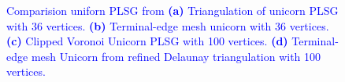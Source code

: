 \begin{figure}[!h]
\centering     %
{}%
%
%

\caption{\textcolor{blue}{Comparision uniforn PLSG from \cite{AlejandroNUA2019} \textbf{(a)} Triangulation of unicorn PLSG with 36 vertices. \textbf{(b)} Terminal-edge mesh unicorn with 36 vertices. \textbf{(c)} Clipped Voronoi Unicorn PLSG with 100 vertices. \textbf{(d)} Terminal-edge mesh Unicorn from refined Delaunay triangulation with 100 vertices.}}
\label{figs:univornPSLG} 
\end{figure}

